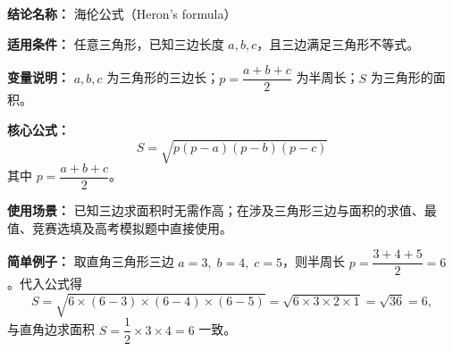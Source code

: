 \textbf{结论名称：} 海伦公式（Heron's formula）

\textbf{适用条件：} 任意三角形，已知三边长度 $a,b,c$，且三边满足三角形不等式。

\textbf{变量说明：} $a,b,c$ 为三角形的三边长；$p=\dfrac{a+b+c}{2}$ 为半周长；$S$ 为三角形的面积。

\textbf{核心公式：} 
\[ \boxed{S = \sqrt{p(p-a)(p-b)(p-c)}} \]
其中 $p=\dfrac{a+b+c}{2}$。

\textbf{使用场景：} 已知三边求面积时无需作高；在涉及三角形三边与面积的求值、最值、竞赛选填及高考模拟题中直接使用。

\textbf{简单例子：} 取直角三角形三边 $a=3,\;b=4,\;c=5$，则半周长 $p=\dfrac{3+4+5}{2}=6$。代入公式得
\[ S=\sqrt{6\times(6-3)\times(6-4)\times(6-5)}=\sqrt{6\times3\times2\times1}=\sqrt{36}=6, \]
与直角边求面积 $S=\dfrac{1}{2}\times3\times4=6$ 一致。